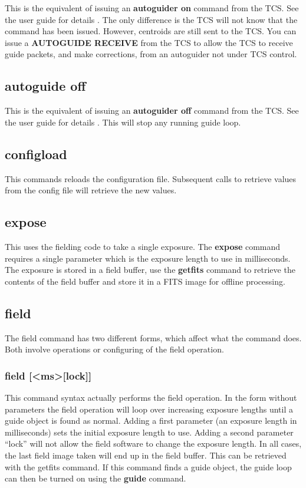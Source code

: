 \documentclass[10pt,a4paper]{article}
\begin{document}
This is the equivalent of issuing an {\bf autoguider on} command from the TCS. See the user guide for details \cite{bib:autoguideruserguide}. The only difference is the TCS will not know that the command has been issued. However, centroids are still sent to the TCS. You can issue a {\bf AUTOGUIDE RECEIVE} from the TCS to allow the TCS to receive guide packets, and make corrections, from an autoguider not under TCS control.

\subsection{autoguide off}

This is the equivalent of issuing an {\bf autoguider off} command from the TCS. See the user guide for details \cite{bib:autoguideruserguide}. This will stop any running guide loop.

\subsection{configload}

This commands reloads the configuration file. Subsequent calls to retrieve values from the config file will retrieve the new values. 

\subsection{expose}

This uses the fielding code to take a single exposure. The {\bf expose} command requires a single parameter which is the exposure length to use in milliseconds. The exposure is stored in a field buffer, use the {\bf getfits} command to retrieve the contents of the field buffer and store it in a FITS image for offline processing.

\subsection{field}

The field command has two different forms, which affect what the command does. Both involve operations or configuring of the field operation.

\subsubsection{field [\textless ms\textgreater  [lock]]}

This command syntax actually performs the field operation. In the form without parameters the field operation will loop
over increasing exposure lengths until a guide object is found as normal. Adding a first parameter (an exposure length in milliseconds) sets the initial exposure length to use. Adding a second parameter ``lock'' will not allow the field software to change the exposure length. In all cases, the last field image taken will end up in the field buffer. This can be retrieved with the getfits command. If this command finds a guide object, the guide loop can then be turned on using the {\bf guide} command.
\end{document}
